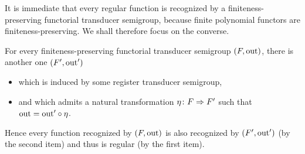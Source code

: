 \documentclass[a4paper,UKenglish,cleveref, autoref, thm-restate, numberwithinsect]{lipics-v2021}
\begin{document}
It is immediate that every regular function is recognized by a finiteness-preserving functorial transducer semigroup, because finite polynomial functors are finiteness-preserving. We shall therefore focus on the converse.

\begin{theorem}
  For every finiteness-preserving functorial transducer semigroup $(\functor, \outfun)$, there is another one $(\functor',\outfun')$
  \begin{itemize}
    \item which is induced by some register transducer semigroup,
    \item and which admits a natural transformation $\eta \colon \functor \Rightarrow \functor'$ such that $\mathrm{out} = \mathrm{out}' \circ \eta$.
  \end{itemize}
  Hence every function recognized by $(\functor,\outfun)$ is also recognized by $(\functor',\outfun')$ (by the second item) and thus is regular (by the first item).
\end{theorem}
\end{document}
